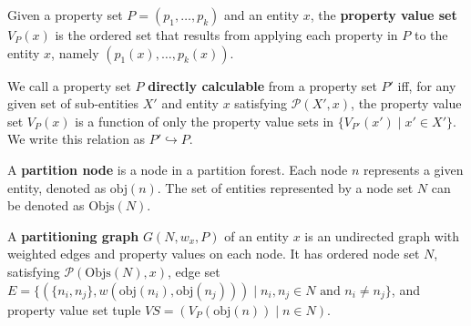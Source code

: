 \begin{definition}
Given a property set $P = (p_1,\ldots,p_k)$ and an entity $x$, the \textbf{property value set} $V_P(x)$ is the ordered set that results from applying each property in $P$ to the entity $x$, namely $(p_1(x),\ldots,p_k(x))$.
\end{definition}

\begin{definition}
We call a property set $P$ \textbf{directly calculable} from a property set $P'$ iff, for any given set of sub-entities $X'$ and entity $x$ satisfying $\mathcal{P}(X',x)$, the property value set $V_P(x)$ is a function of only the property value sets in $\{V_{P'}(x') \; | \; x' \in X'\}$. We write this relation as $P' \hookrightarrow P$.
\end{definition}

\begin{definition}
A \textbf{partition node} is a node in a partition forest. Each node $n$ represents a given entity, denoted as $\mbox{obj}(n)$. The set of entities represented by a node set $N$ can be denoted as $\mbox{Objs}(N)$.
\end{definition}

\begin{definition}
A \textbf{partitioning graph} $G(N,w_x,P)$ of an entity $x$ is an undirected graph with weighted edges and property values on each node. It has ordered node set $N$, satisfying $\mathcal{P}(\mbox{Objs}(N),x)$, edge set $E = \{(\{n_i,n_j\},w(\mbox{obj}(n_i),\mbox{obj}(n_j))) \; | \; n_i, n_j \in N \mbox{ and } n_i \ne n_j\}$, and property value set tuple $\textit{VS} = (V_P(\mbox{obj}(n)) \; | \; n \in N)$.
\end{definition}

\newpage

